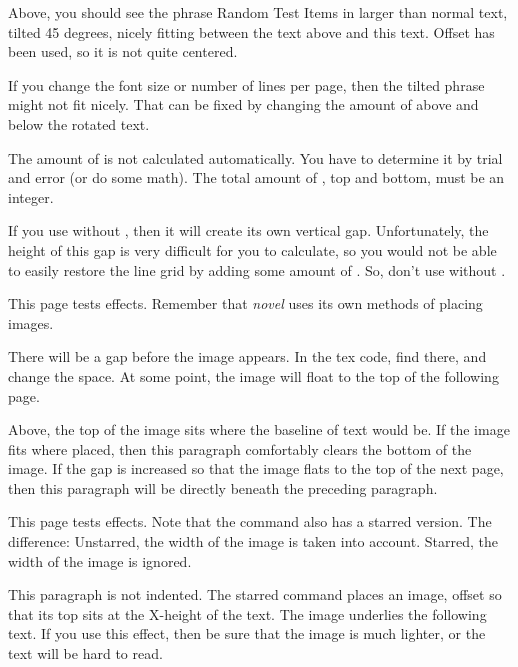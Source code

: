 \documentclass[test,shademargins,draft]{novel} %
\begin{document}
Above, you should see the phrase Random Test Items in larger than normal text, tilted 45 degrees, nicely fitting between the text above and this text. Offset has been used, so it is not quite centered.

If you change the font size or number of lines per page, then the tilted phrase might not fit nicely. That can be fixed by changing the amount of \string\vspace\space above and below the rotated text.

The amount of \string\vspace\space is not calculated automatically. You have to determine it by trial and error (or do some math). The total amount of \string\vspace, top and bottom, must be an integer.

If you use \string\rotatebox\space without \string\charscale, then it will create its own vertical gap. Unfortunately, the height of this gap is very difficult for you to calculate, so you would not be able to easily restore the line grid by adding some amount of \string\vspace. So, don't use \string\rotatebox\space without \string\charscale.

\clearpage



This page tests \string\FloatImage\space effects. Remember that \textit{novel} uses its own methods of placing images.

There will be a gap before the image appears. In the tex code, find \string\vspace\space there, and change the space. At some point, the image will float to the top of the following page.

\vspace{7\nbs}


Above, the top of the image sits where the baseline of text would be. If the image fits where placed, then this paragraph comfortably clears the bottom of the image. If the gap is increased so that the image flats to the top of the next page, then this paragraph will be directly beneath the preceding paragraph.



\clearpage


This page tests \string\InlineImage\space effects. Note that the command also has a starred version. The difference: Unstarred, the width of the image is taken into account. Starred, the width of the image is ignored.

\null

\noindent{}This paragraph is not indented. The starred command places an image, offset so that its top sits at the X-height of the text. The image underlies the following text. If you use this effect, then be sure that the image is much lighter, or the text will be hard to read.
\end{document}
